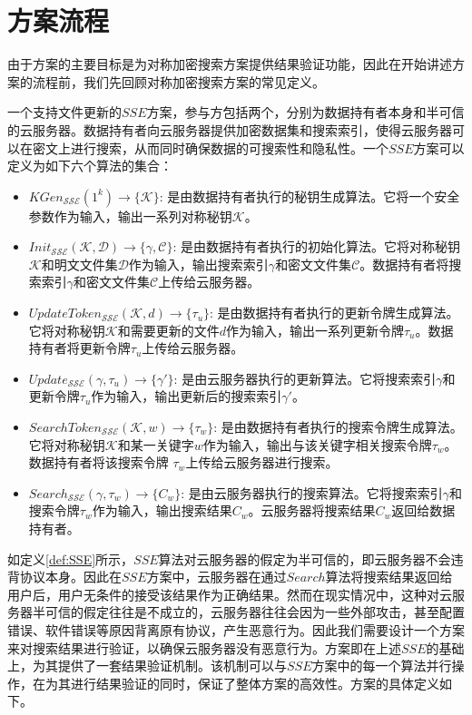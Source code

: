 \section{方案流程}
由于\single 方案的主要目标是为对称加密搜索方案提供结果验证功能，因此在开始讲述\single 方案的流程前，我们先回顾对称加密搜索方案的常见定义。
\begin{definition}\label{def:SSE}
  {
    一个支持文件更新的$SSE$方案，参与方包括两个，分别为数据持有者本身和半可信的云服务器。数据持有者向云服务器提供加密数据集和搜索索引，使得云服务器可以在密文上进行搜索，从而同时确保数据的可搜索性和隐私性。一个$SSE$方案可以定义为如下六个算法的集合：
    \begin{itemize}
      \item $KGen_{\mathcal{SSE}}(1^k) \rightarrow \{\mathcal{K}\}$: 是由数据持有者执行的秘钥生成算法。它将一个安全参数作为输入，输出一系列对称秘钥$\mathcal{K}$。
      \item $Init_{\mathcal{SSE}}(\mathcal{K}, \mathcal{D}) \rightarrow \{\gamma, \mathcal{C}\}$: 是由数据持有者执行的初始化算法。它将对称秘钥$\mathcal{K}$和明文文件集$\mathcal{D}$作为输入，输出搜索索引$\gamma$和密文文件集$\mathcal{C}$。数据持有者将搜索索引$\gamma$和密文文件集$\mathcal{C}$上传给云服务器。
      \item $UpdateToken_{\mathcal{SSE}}(\mathcal{K}, d) \rightarrow \{\tau_u\}$: 是由数据持有者执行的更新令牌生成算法。它将对称秘钥$\mathcal{K}$和需要更新的文件$d$作为输入，输出一系列更新令牌$\tau_u$。数据持有者将更新令牌$\tau_u$上传给云服务器。
      \item $Update_{\mathcal{SSE}}(\gamma, \tau_u) \rightarrow \{\gamma'\}$: 是由云服务器执行的更新算法。它将搜索索引$\gamma$和更新令牌$\tau_u$作为输入，输出更新后的搜索索引$\gamma'$。
      \item $SearchToken_{\mathcal{SSE}}(\mathcal{K}, w) \rightarrow \{\tau_{w}\}$: 是由数据持有者执行的搜索令牌生成算法。它将对称秘钥$\mathcal{K}$和某一关键字$w$作为输入，输出与该关键字相关搜索令牌$\tau_{w}$。数据持有者将该搜索令牌 $\tau_{w}$上传给云服务器进行搜索。
      \item $Search_{\mathcal{SSE}}(\gamma, \tau_{w}) \rightarrow \{C_w\}$: 是由云服务器执行的搜索算法。它将搜索索引$\gamma$和搜索令牌$\tau_{w}$作为输入，输出搜索结果$C_w$。云服务器将搜索结果$C_w$返回给数据持有者。
    \end{itemize}
  }
\end{definition}

如定义\ref{def:SSE}所示，$SSE$算法对云服务器的假定为半可信的，即云服务器不会违背协议本身。因此在$SSE$方案中，云服务器在通过$Search$算法将搜索结果返回给用户后，用户无条件的接受该结果作为正确结果。然而在现实情况中，这种对云服务器半可信的假定往往是不成立的，云服务器往往会因为一些外部攻击，甚至配置错误、软件错误等原因背离原有协议，产生恶意行为。因此我们需要设计一个方案来对搜索结果进行验证，以确保云服务器没有恶意行为。\single 方案即在上述$SSE$的基础上，为其提供了一套结果验证机制。该机制可以与$SSE$方案中的每一个算法并行操作，在为其进行结果验证的同时，保证了整体方案的高效性。\single 方案的具体定义如下。

